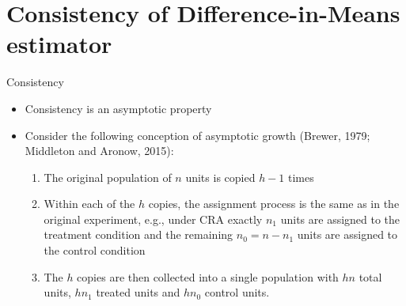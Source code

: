 \documentclass[table, xcolor={dvipsnames}, 9pt]{beamer}
\theoremstyle{newstyle}
\begin{document}
\section{Consistency of Difference-in-Means estimator}
\begin{frame}{Consistency}
\begin{itemize}
\item Consistency is an asymptotic property
\item Consider the following conception of asymptotic growth (Brewer, 1979; Middleton and Aronow, 2015):
\begin{enumerate}
\item The original population of $n$ units is copied $h − 1$ times 
\item Within each of the $h$ copies, the assignment process is the same as in the original experiment, e.g., under CRA exactly $n_1$ units are assigned to the treatment condition and the remaining $n_0 = n − n_1$ units are assigned to the control condition
\item The $h$ copies are then collected into a single population with $hn$ total units, $hn_1$ treated units and $hn_0$ control units.
\end{enumerate}  
\end{itemize}
\end{frame}
\end{document}
